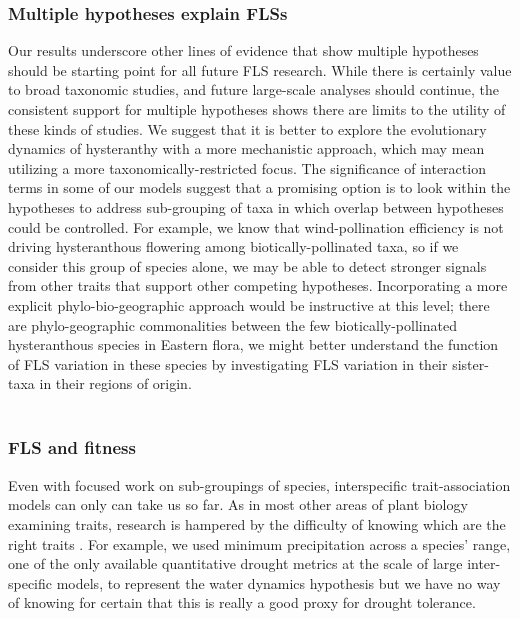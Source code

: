 \documentclass{article}
\begin{document}
{\subsubsection*{Multiple hypotheses explain FLSs}

\noindent Our results underscore other lines of evidence that show multiple hypotheses should be starting point for all future FLS research. While there is certainly value to broad taxonomic studies, and future large-scale analyses should continue, the consistent support for multiple hypotheses shows there are limits to the utility of these kinds of studies. We suggest that it is better to explore the evolutionary dynamics of hysteranthy with a more mechanistic approach, which may mean utilizing a more taxonomically-restricted focus. The significance of interaction terms in some of our models suggest that a promising option is to look within the hypotheses to address sub-grouping of taxa in which overlap between hypotheses could be controlled. For example, we know that wind-pollination efficiency is not driving hysteranthous flowering among biotically-pollinated taxa, so if we consider this group of species alone, we may be able to detect stronger signals from other traits that support other competing hypotheses. Incorporating a more explicit phylo-bio-geographic approach would be instructive at this level; there are phylo-geographic commonalities between the few biotically-pollinated hysteranthous species in Eastern flora, we might better understand the function of FLS variation in these species by investigating FLS variation in their sister-taxa in their regions of origin.\\ 

\subsubsection*{FLS and fitness}
Even with focused work on sub-groupings of species, interspecific trait-association models can only can take us so far. As in most other areas of plant biology examining traits, research is hampered by the difficulty of knowing which are the right traits \citep{}. For example, we used minimum precipitation across a species' range, one of the only available quantitative drought metrics at the scale of large inter-specific models, to represent the water dynamics hypothesis but we have no way of knowing for certain that this is really a good proxy for drought tolerance. \\

}
\end{document}
